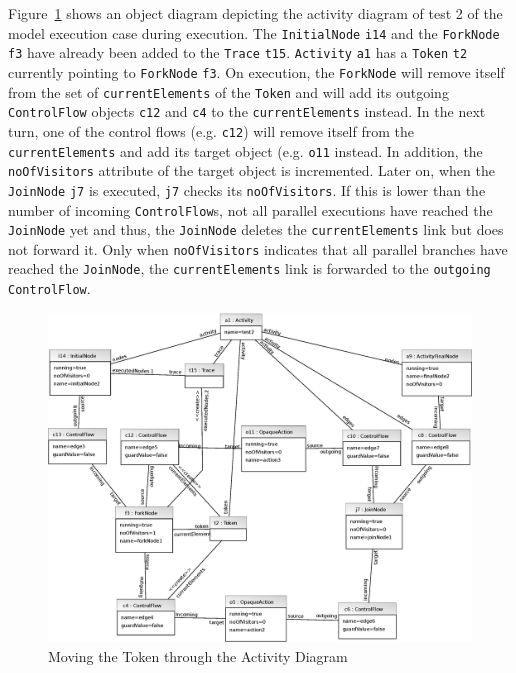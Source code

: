 \documentclass[submission,copyright,creativecommons]{eptcs}
\begin{document}
Figure~\ref{fig:ActivityObjectDiagram} shows an object diagram depicting the activity diagram of test 2 of the model execution case during execution. The \texttt{InitialNode} \texttt{i14} 
and the \texttt{ForkNode} \texttt{f3} have already been added to the \texttt{Trace} 
\texttt{t15}. \texttt{Activity} \texttt{a1} has a \texttt{Token} \texttt{t2} currently
pointing to \texttt{ForkNode} \texttt{f3}. On execution, the \texttt{ForkNode} will remove itself from the set of \texttt{currentElements} of the \texttt{Token} and will add its 
outgoing \texttt{ControlFlow} objects \texttt{c12} and \texttt{c4} to the \texttt{currentElements} instead. In the next turn, one of the control flows (e.g. \texttt{c12}) 
will remove itself from the \texttt{currentElements} and add its target object (e.g. 
\texttt{o11} instead. In addition, the \texttt{noOfVisitors} attribute of the target object 
is incremented. Later on, when the \texttt{JoinNode} \texttt{j7} is executed, 
\texttt{j7} checks its \texttt{noOfVisitors}. If this is lower than the number of 
incoming \texttt{ControlFlow}s, not all parallel executions have reached the \texttt{JoinNode}
yet and thus, the \texttt{JoinNode} deletes the \texttt{currentElements} link but does not 
forward it. Only when \texttt{noOfVisitors} indicates that all parallel branches have reached 
the \texttt{JoinNode}, the \texttt{currentElements} link is forwarded to the \texttt{outgoing}
\texttt{ControlFlow}.  


\begin{figure}[ht] \centering
	\includegraphics[width=\linewidth]{images/ActivityObjectDiagram.eps}
 \caption{Moving the Token through the Activity Diagram}
 \label{fig:ActivityObjectDiagram}
\end{figure}
\end{document}
